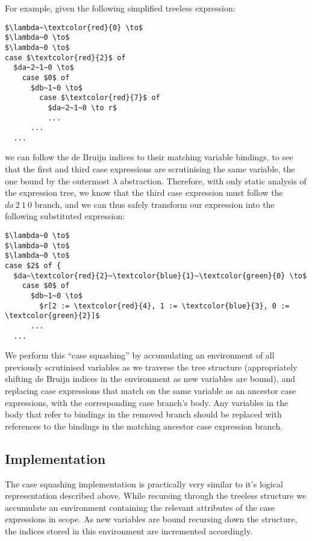 For example, given the following simplified treeless expression:

\begin{lstlisting}[style=math]
$\lambda~\textcolor{red}{0} \to$
$\lambda~0 \to$
$\lambda~0 \to$
case $\textcolor{red}{2}$ of
  $da~2~1~0 \to$
    case $0$ of
      $db~1~0 \to$
        case $\textcolor{red}{7}$ of
          $da~2~1~0 \to r$
          ...
      ...
  ...
\end{lstlisting}

we can follow the de Bruijn indices to their matching variable bindings, to see that the first and third case expressions are scrutinising the same variable, the one bound by the outermost $\lambda$ abstraction. Therefore, with only static analysis of the expression tree, we know that the third case expression must follow the $da~2~1~0$ branch, and we can thus safely transform our expression into the following substituted expression:

\begin{lstlisting}[style=math]
$\lambda~0 \to$
$\lambda~0 \to$
$\lambda~0 \to$
case $2$ of {
  $da~\textcolor{red}{2}~\textcolor{blue}{1}~\textcolor{green}{0} \to$
    case $0$ of
      $db~1~0 \to$
        $r[2 := \textcolor{red}{4}, 1 := \textcolor{blue}{3}, 0 := \textcolor{green}{2}]$
      ...
  ...
\end{lstlisting}

We perform this ``case squashing'' by accumulating an environment of all previously scrutinised variables as we traverse the tree structure (appropriately shifting de Bruijn indices in the environment as new variables are bound), and replacing case expressions that match on the same variable as an ancestor case expressions, with the corresponding case branch's body. Any variables in the body that refer to bindings in the removed branch should be replaced with references to the bindings in the matching ancestor case expression branch.

\subsection{Implementation}

The case squashing implementation is practically very similar to it's logical representation described above. While recursing through the treeless structure we accumulate an environment containing the relevant attributes of the case expressions in scope. As new variables are bound recursing down the structure, the indices stored in this environment are incremented accordingly.

